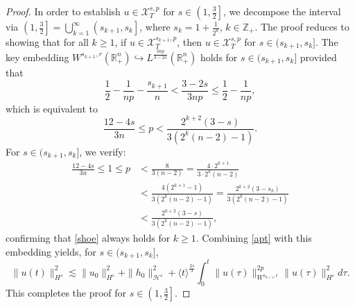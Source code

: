 \documentclass[preprint,compress,12pt]{elsarticle}
\numberwithin{equation}{section}
\begin{document}
\begin{proof}
	
	In order to establish $u\in \mathscr{X}^{s,p}_{T}$ for $s\in \left(1,\frac{3}{2}\right]$, we decompose the interval via $\left(1,\frac{3}{2}\right]=\bigcup_{k=1}^{\infty}\left(s_{k+1},s_{k}\right]$, where $s_{k}= 1+\frac{1}{2^{k}}$, $k\in \mathbb{Z}_{+}$.
	The proof reduces to showing that for all  $k\geq 1$, if $u\in\mathscr{X}^{s_{k+1},p}_{T}$, then  $u\in\mathscr{X}^{s,p}_{T}$ for $s\in (s_{k+1},s_{k}]$. The key embedding $W^{s_{k+1},r}(\mathbb{R}_{+}^{n})\hookrightarrow L^{\frac{3np}{3-2s}}(\mathbb{R}_{+}^{n})$ holds for $s\in(s_{k+1},s_{k}]$ provided that
	\begin{equation}\label{421+}		\frac{1}{2}-\frac{1}{np}-\frac{s_{k+1}}{n} <\frac{3-2s}{3np}\leq \frac{1}{2}-\frac{1}{np},
	\end{equation}
	which is equivalent to
	\begin{equation}\label{shoe}
		\frac{12-4s}{3n}\leq p<\frac{2^{k+2}(3-s)}{3(2^{k}(n-2)-1)}.
	\end{equation}
	For $s\in (s_{k+1},s_{k}]$, we verify:
	\begin{equation*}
		\begin{aligned}
			\frac{12-4s}{3n}\leq1\leq p&<\frac{8}{3(n-2)}=\frac{4\cdot 2^{k+1}}{3\cdot2^{k}(n-2)}\\
			&<\frac{4(2^{k+1}-1)}{3(2^{k}(n-2)-1)}
			=\frac{2^{k+2}(3-s_{k})}{3(2^{k}(n-2)-1)}\\
			&<\frac{2^{k+2}(3-s)}{3(2^{k}(n-2)-1)},
		\end{aligned}
	\end{equation*}
	confirming that \eqref{shoe} always holds for $k\geq1$. Combining \eqref{apt} with this embedding yields, for $s\in (s_{k+1},s_{k}]$,
	\begin{equation}\label{423+}
		\|u(t)\|_{H^{s}}^{2}\lesssim \|u_{0}\|_{H^{s}}^{2}+\|h_{0}\|_{\mathcal{H}^{s}}^{2}+\langle t\rangle^{\frac{2s}{3}}\int_{0}^{t}\|u(\tau)\|_{W^{s_{k+1},r}}^{2p} \|u(\tau)\|_{H^{s}}^{2}d\tau.
	\end{equation}
	This completes the proof for $s \in \left(1,\frac{3}{2}\right]$.
	

\end{proof}
\end{document}

